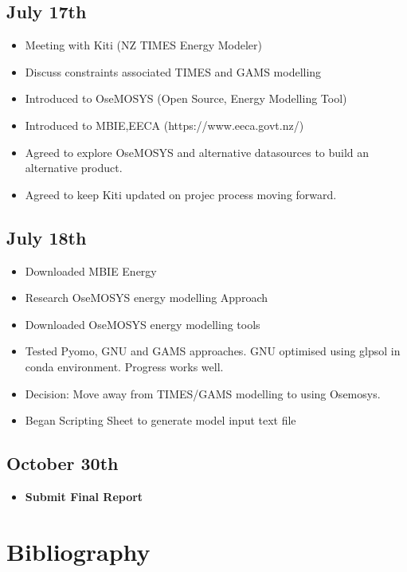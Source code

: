 \documentclass[12pt]{article}
\begin{document}
\subsection{July 17th}
\begin{itemize}
	\item Meeting with Kiti (NZ TIMES Energy Modeler)
	\item Discuss constraints associated TIMES and GAMS modelling
	\item Introduced to OseMOSYS (Open Source, Energy Modelling Tool)
	\item Introduced to MBIE,EECA (https://www.eeca.govt.nz/)
	\item Agreed to explore OseMOSYS and alternative datasources to build an alternative product.
	\item Agreed to keep Kiti updated on projec process moving forward.
\end{itemize}
\subsection{July 18th}
\begin{itemize}
	\item Downloaded MBIE Energy 
	\item Research OseMOSYS energy modelling Approach
	\item Downloaded OseMOSYS energy modelling tools
	\item Tested Pyomo, GNU and GAMS approaches. GNU optimised using glpsol in conda environment. Progress works well.
	\item Decision: Move away from TIMES/GAMS modelling to using Osemosys.
	\item Began Scripting Sheet to generate model input text file
\end{itemize}
\subsection{October 30th}
\begin{itemize}
	\item \textbf{Submit Final Report}
\end{itemize}
\section{Bibliography}
\printbibliography
\end{document}
